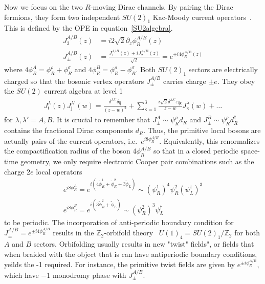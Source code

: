 Now we focus on the two $R$-moving Dirac channels. By pairing the Dirac fermions, they form two independent $SU(2)_1$ Kac-Moody current operators~\cite{bigyellowbook}. This is defined by the OPE in equation~\ref{SU2algebra}. \begin{align}J_3^{A/B}(z)&=i2\sqrt{2}\partial_z\phi^{A/B}_R(z)\label{SU2current}\\J_\pm^{A/B}(z)&=\frac{J_1^{A/B}(z)\pm iJ_2^{A/B}(z)}{\sqrt{2}}=e^{\pm i4\phi^{A/B}_R(z)}\nonumber\end{align} where $4\phi^A_R=\phi^\rho_R+\phi^\sigma_R$ and $4\phi^B_R=\phi^\rho_R-\phi^\sigma_R$. Both $SU(2)_1$ sectors are electrically charged so that the bosonic vertex operators $J_\pm^{A/B}$ carries charge $\pm e$. They obey the $SU(2)$ current algebra at level 1 \begin{align}J^\lambda_{\mathsf{i}}(z)J^{\lambda'}_{\mathsf{j}}(w)=\frac{\delta^{\lambda\lambda'}\delta_{\mathsf{ij}}}{(z-w)^2}+\sum_{\mathsf{k}=1}^3\frac{i\sqrt{2}\delta^{\lambda\lambda'}\varepsilon_{\mathsf{ijk}}}{z-w}J^\lambda_{\mathsf{k}}(w)+\ldots\label{SU2algebra}\end{align} for $\lambda,\lambda'=A,B$. It is crucial to remember that $J_\pm^A\sim\psi^\rho_Rd_R$ and $J_\pm^B\sim\psi^\rho_Rd_R^\dagger$ contains the fractional Dirac components $d_R$. Thus, the primitive local bosons are actually pairs of the current operators, i.e.~$e^{i8\phi^{A/B}_R}$. Equivalently, this renormalizes the compactification radius of the boson $4\phi^{A/B}_R$ so that in a closed periodic space-time geometry, we only require electronic Cooper pair combinations such as the charge $2e$ local operators \begin{gather}e^{i8\phi^A_R}=e^{i(4\tilde\phi^1_R+\tilde\phi^2_R+3\tilde\phi_L)}\sim(\psi^1_R)^4\psi^2_R(\psi_L^\dagger)^3\nonumber\\e^{i8\phi^B_R}=e^{i(3\tilde\phi^2_R+\tilde\phi_L)}\sim(\psi^2_R)^3\psi_L^\dagger\end{gather} to be periodic. The incorporation of anti-periodic boundary condition for $J_\pm^{A/B}=e^{\pm i4\phi^{A/B}_R}$ results in the $\mathbb{Z}_2$-orbifold theory~\cite{Ginsparg88,DijkgraafVafaVerlindeVerlinde99} $U(1)_4=SU(2)_1/\mathbb{Z}_2$ for both $A$ and $B$ sectors. Orbifolding usually results in new "twist" fields", or fields that when braided with the object that is can have antiperiodic boundary conditions, yeilds the -1 required. For instance, the primitive twist fields are given by $e^{\pm i\phi^{A/B}_R}$, which have $-1$ monodromy phase with $J_\pm^{A/B}$. 


